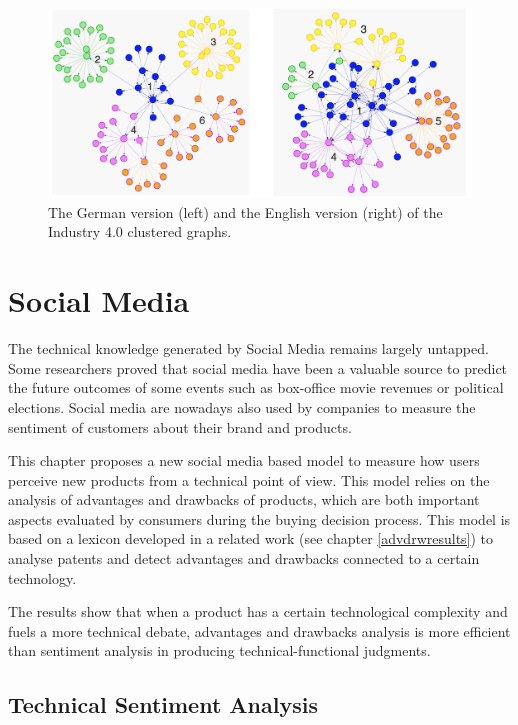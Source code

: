 \documentclass[]{book}
\theoremstyle{definition}
\theoremstyle{definition}
\theoremstyle{definition}
\theoremstyle{remark}
\begin{document}
\begin{figure}

{\centering \includegraphics[width=1\linewidth]{_bookdown_files/figures/industrie_clusters} 

}

\caption{The German version (left) and the English version (right) of the Industry 4.0 clustered graphs.}\label{fig:industrieclusters}
\end{figure}

\chapter{Social Media}\label{social-media}

The technical knowledge generated by Social Media remains largely
untapped. Some researchers proved that social media have been a valuable
source to predict the future outcomes of some events such as box-office
movie revenues or political elections. Social media are nowadays also
used by companies to measure the sentiment of customers about their
brand and products.

This chapter proposes a new social media based model to measure how
users perceive new products from a technical point of view. This model
relies on the analysis of advantages and drawbacks of products, which
are both important aspects evaluated by consumers during the buying
decision process. This model is based on a lexicon developed in a
related work (see chapter \ref{advdrwresults}) to analyse patents and
detect advantages and drawbacks connected to a certain technology.

The results show that when a product has a certain technological
complexity and fuels a more technical debate, advantages and drawbacks
analysis is more efficient than sentiment analysis in producing
technical-functional judgments.

\section{Technical Sentiment Analysis}\label{techsentanal}
\end{document}
